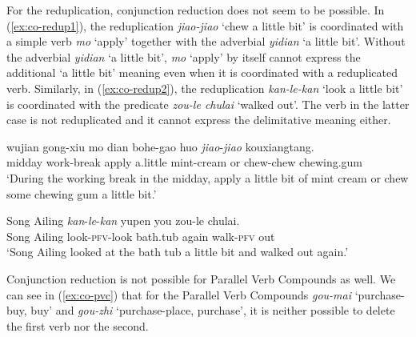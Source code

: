   \z
\z

For the reduplication, conjunction reduction does not seem to be possible. 
In (\ref{ex:co-redup1}), the reduplication \textit{jiao-jiao} `chew a little bit' is coordinated with a simple verb \textit{mo} `apply' together with the adverbial \textit{yidian} `a little bit'.
Without the adverbial \textit{yidian} `a little bit', \textit{mo} `apply' by itself cannot express the additional `a little bit' meaning even when it is coordinated with a reduplicated verb.
Similarly, in (\ref{ex:co-redup2}), the reduplication \textit{kan-le-kan} `look a little bit' is coordinated with the predicate \textit{zou-le chulai} `walked out'. The verb in the latter case is not reduplicated and it cannot express the delimitative meaning either.

\settowidth{}

\ea
  \ea\label{ex:co-redup1}
  \gll wujian gong-xiu mo dian bohe-gao huo \textit{jiao}-\textit{jiao} kouxiangtang.\\
    midday work-break apply a.little mint-cream or chew-chew chewing.gum\\ 
    \glt `During the working break in the midday, apply a little bit of mint cream or chew some chewing gum a little bit.'
    
   \ex\label{ex:co-redup2}
   \gll Song Ailing \textit{kan}-\textit{le}-\textit{kan} yupen you zou-le chulai.\\
   Song Ailing look-\textsc{pfv}-look bath.tub again walk-\textsc{pfv} out\\  
   \glt `Song Ailing looked at the bath tub a little bit and walked out again.'
   \z
\z

Conjunction reduction is not possible for Parallel Verb Compounds as well.
We can see in (\ref{ex:co-pvc}) that for the Parallel Verb Compounds \textit{gou-mai} `purchase-buy, buy' and \textit{gou\hyp{}zhi} `purchase\hyp{}place, purchase', it is neither possible to delete the first verb nor the second.

\ea\label{ex:co-pvc}
    
